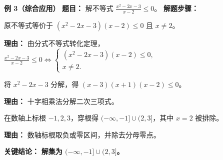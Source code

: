 \begin{examplebox}
	\medskip
	\textbf{\textcolor{CExample}{例 3（综合应用）}}
	\textbf{\textcolor{CExample}{题目：}}
	解不等式 $\frac{x^2-2x-3}{x-2}\le 0$。
	\textbf{\textcolor{CExample}{解题步骤：}}
	\begin{description}[style=nextline, leftmargin=2.8em, labelsep=0.5em, itemsep=0.45em]
		\item[\textbf{第一步（等价转化）：}]
			原不等式等价于 $(x^2-2x-3)(x-2)\le 0$ 且 $x\neq 2$。
			\par\textbf{理由：} 由分式不等式转化定理，$\frac{x^2-2x-3}{x-2}\le 0 \iff
			\begin{cases}
				(x^2-2x-3)(x-2)\le 0,\\ x\neq 2.
		\end{cases}
			$
		\item[\textbf{第二步（因式分解）：}]
			将 $x^2-2x-3$ 分解，得 $(x-3)(x+1)(x-2)\le 0$。
			\par\textbf{理由：} 十字相乘法分解二次三项式。
		\item[\textbf{第三步（穿根定号）：}]
			在数轴上标根 $-1,2,3$，穿根得 $(-\infty,-1]\cup(2,3]$，其中 $x=2$ 被排除。
			\par\textbf{理由：} 数轴标根取负或零区间，并除去分母零点。
	\end{description}
	\textbf{\textcolor{CExample}{关键结论：}}
	\textbf{解集为 $(-\infty,-1]\cup(2,3]$。}
\end{examplebox}
